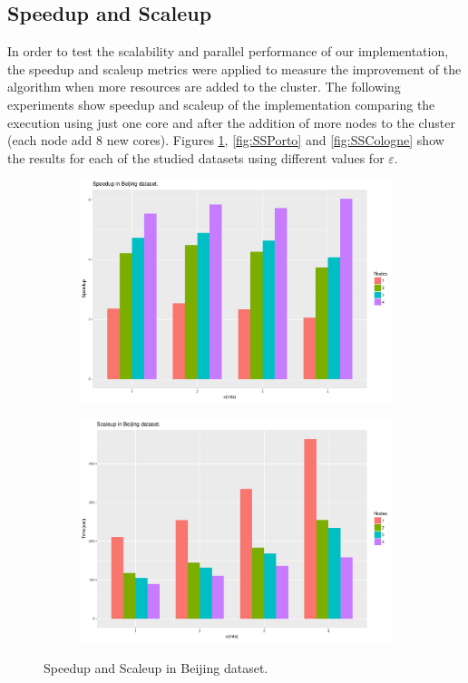 \documentclass[12pt]{scrartcl}
\begin{document}
\subsection{Speedup and Scaleup}
In order to test the scalability and parallel performance of our implementation, the speedup and scaleup metrics were applied to measure the improvement of the algorithm when more resources are added to the cluster.  The following experiments show speedup and scaleup of the implementation comparing the execution using just one core and after the addition of more nodes to the cluster (each node add 8 new cores).  Figures \ref{fig:SSBeijing}, \ref{fig:SSPorto} and \ref{fig:SSCologne} show the results for each of the studied datasets using different values for $\varepsilon$.

\begin{figure}
\centering
\begin{subfigure}{.5\textwidth}
  \centering \includegraphics[width=\linewidth]{figures/2_Beijing_Speedup}
\end{subfigure}%
\begin{subfigure}{.5\textwidth}
  \centering \includegraphics[width=\linewidth]{figures/3_Beijing_Scaleup}
\end{subfigure}
\caption{Speedup and Scaleup in Beijing dataset.}
\label{fig:SSBeijing}
\end{figure}
\end{document}
